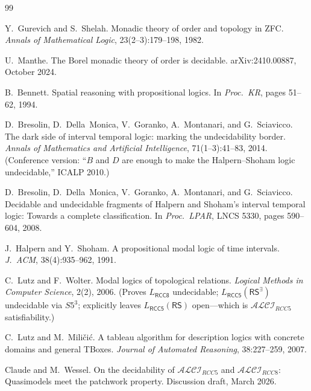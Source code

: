 \documentclass[a4paper,11pt]{article}
\theoremstyle{definition}
\newcommand{\ALCIRCC}[1]{\ensuremath{\mathcal{ALCI}_{\mathit{RCC#1}}}}
\begin{document}
\bigskip

\begin{thebibliography}{99}

Y.~Gurevich and S.~Shelah.
\newblock Monadic theory of order and topology in ZFC.
\newblock \emph{Annals of Mathematical Logic}, 23(2--3):179--198, 1982.

U.~Manthe.
\newblock The Borel monadic theory of order is decidable.
\newblock arXiv:2410.00887, October 2024.

B.~Bennett.
\newblock Spatial reasoning with propositional logics.
\newblock In \emph{Proc.\ KR}, pages 51--62, 1994.

D.~Bresolin, D.~Della~Monica, V.~Goranko, A.~Montanari, and G.~Sciavicco.
\newblock The dark side of interval temporal logic: marking the
  undecidability border.
\newblock \emph{Annals of Mathematics and Artificial Intelligence},
  71(1--3):41--83, 2014.
\newblock (Conference version: ``$B$ and $D$ are enough to make the
  Halpern--Shoham logic undecidable,'' ICALP 2010.)

D.~Bresolin, D.~Della~Monica, V.~Goranko, A.~Montanari, and G.~Sciavicco.
\newblock Decidable and undecidable fragments of Halpern and Shoham's
  interval temporal logic: Towards a complete classification.
\newblock In \emph{Proc.\ LPAR}, LNCS 5330, pages 590--604, 2008.

J.~Halpern and Y.~Shoham.
\newblock A propositional modal logic of time intervals.
\newblock \emph{J.\ ACM}, 38(4):935--962, 1991.

C.~Lutz and F.~Wolter.
\newblock Modal logics of topological relations.
\newblock \emph{Logical Methods in Computer Science}, 2(2), 2006.
\newblock (Proves $L_{\mathsf{RCC8}}$ undecidable;
  $L_{\mathsf{RCC5}}(\mathsf{RS}^{\exists})$ undecidable via $S5^3$;
  explicitly leaves $L_{\mathsf{RCC5}}(\mathsf{RS})$ open---which is
  $\ALCIRCC{5}$ satisfiability.)

C.~Lutz and M.~Mili\v{c}i\'{c}.
\newblock A tableau algorithm for description logics with concrete
  domains and general TBoxes.
\newblock \emph{Journal of Automated Reasoning}, 38:227--259, 2007.

Claude and M.~Wessel.
\newblock On the decidability of $\mathcal{ALCI}_{RCC5}$ and
  $\mathcal{ALCI}_{RCC8}$: Quasimodels meet the patchwork property.
\newblock Discussion draft, March 2026.


\end{thebibliography}
\end{document}
